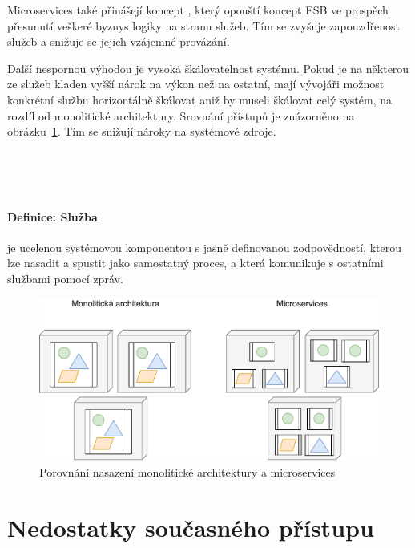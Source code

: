 Microservices také přinášejí koncept ,
který opouští koncept ESB ve prospěch přesunutí veškeré byznys logiky
na stranu služeb. Tím se zvyšuje zapouzdřenost služeb a snižuje se
jejich vzájemné provázání.

Další nespornou výhodou je vysoká škálovatelnost systému. Pokud je na
některou ze služeb kladen vyšší nárok na výkon než na ostatní, mají
vývojáři možnost konkrétní službu horizontálně škálovat aniž by
museli škálovat celý systém, na rozdíl od monolitické architektury.
Srovnání přístupů je znázorněno na obrázku~\ref{fig:microservices-deployment}.
Tím se snižují nároky na systémové zdroje.

~\cite{perrey2003service}
~\cite{sprott2004understanding}


~\cite{nginx2015fourtier}



\paragraph{Definice: Služba} je ucelenou systémovou komponentou
s jasně definovanou zodpovědností, kterou lze nasadit a spustit jako
samostatný proces, a která komunikuje s ostatními službami pomocí zpráv.

\begin{figure}
    \centering
    \includegraphics[keepaspectratio=true, width=0.8\linewidth]{figures/microservices-deployment.pdf}
    \caption{Porovnání nasazení monolitické architektury a microservices}
    \label{fig:microservices-deployment}
\end{figure}

\section{Nedostatky současného přístupu}

